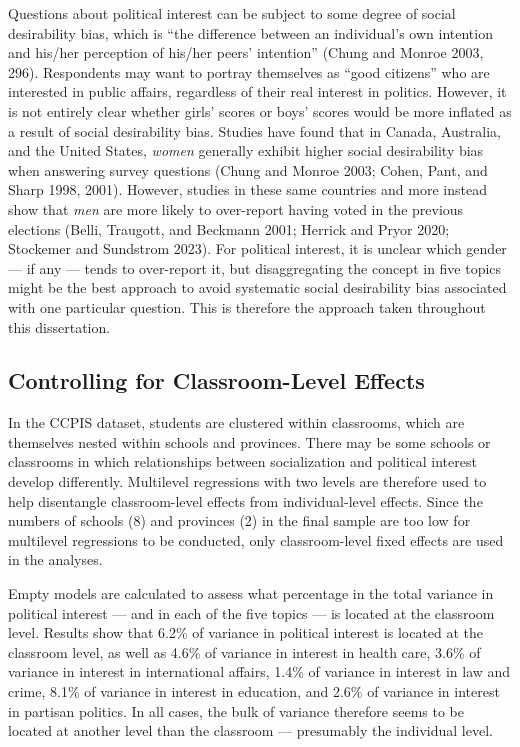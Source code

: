 \documentclass[
  letterpaper,
  DIV=11,
  numbers=noendperiod]{scrreprt}
\begin{document}
Questions about political interest can be subject to some degree of
social desirability bias, which is ``the difference between an
individual's own intention and his/her perception of his/her peers'
intention'' (Chung and Monroe 2003, 296). Respondents may want to
portray themselves as ``good citizens'' who are interested in public
affairs, regardless of their real interest in politics. However, it is
not entirely clear whether girls' scores or boys' scores would be more
inflated as a result of social desirability bias. Studies have found
that in Canada, Australia, and the United States, \emph{women} generally
exhibit higher social desirability bias when answering survey questions
(Chung and Monroe 2003; Cohen, Pant, and Sharp 1998, 2001). However,
studies in these same countries and more instead show that \emph{men}
are more likely to over-report having voted in the previous elections
(Belli, Traugott, and Beckmann 2001; Herrick and Pryor 2020; Stockemer
and Sundstrom 2023). For political interest, it is unclear which gender
--- if any --- tends to over-report it, but disaggregating the concept
in five topics might be the best approach to avoid systematic social
desirability bias associated with one particular question. This is
therefore the approach taken throughout this dissertation.

\hypertarget{controlling-for-classroom-level-effects}{%
\subsection{Controlling for Classroom-Level
Effects}\label{controlling-for-classroom-level-effects}}

In the CCPIS dataset, students are clustered within classrooms, which
are themselves nested within schools and provinces. There may be some
schools or classrooms in which relationships between socialization and
political interest develop differently. Multilevel regressions with two
levels are therefore used to help disentangle classroom-level effects
from individual-level effects. Since the numbers of schools (8) and
provinces (2) in the final sample are too low for multilevel regressions
to be conducted, only classroom-level fixed effects are used in the
analyses.

Empty models are calculated to assess what percentage in the total
variance in political interest --- and in each of the five topics --- is
located at the classroom level. Results show that 6.2\% of variance in
political interest is located at the classroom level, as well as 4.6\%
of variance in interest in health care, 3.6\% of variance in interest in
international affairs, 1.4\% of variance in interest in law and crime,
8.1\% of variance in interest in education, and 2.6\% of variance in
interest in partisan politics. In all cases, the bulk of variance
therefore seems to be located at another level than the classroom ---
presumably the individual level.
\end{document}
